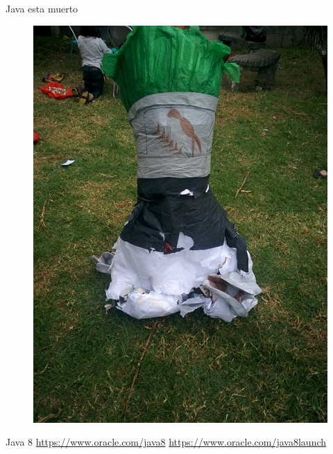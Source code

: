 \documentclass{beamer}
\begin{document}
\begin{frame}{Java esta muerto}
\begin{figure}
	\centering
	\includegraphics[width=0.5\linewidth]{Images/dukedead.jpg}
\end{figure}
\end{frame}

\begin{frame}{Java 8}
\href{https://www.oracle.com/java8}{https://www.oracle.com/java8}
\href{https://www.oracle.com/java8launch}{https://www.oracle.com/java8launch}
\end{frame}
\end{document}
